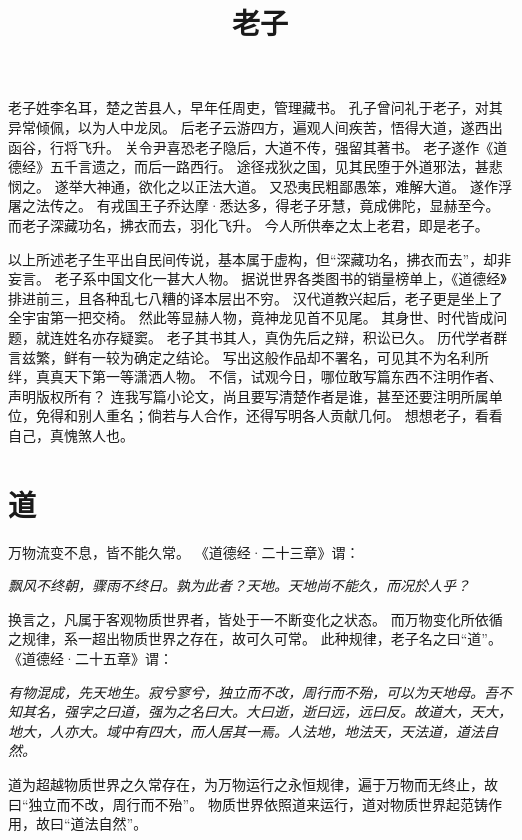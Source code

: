 \documentclass[11pt]{article}
\title{老子}
\date{}
\begin{document}
  \maketitle
  
  \linenumbers

老子姓李名耳，楚之苦县人，早年任周吏，管理藏书。
孔子曾问礼于老子，对其异常倾佩，以为人中龙凤。
后老子云游四方，遍观人间疾苦，悟得大道，遂西出函谷，行将飞升。
关令尹喜恐老子隐后，大道不传，强留其著书。
老子遂作《道德经》五千言遗之，而后一路西行。
途径戎狄之国，见其民堕于外道邪法，甚悲悯之。
遂举大神通，欲化之以正法大道。
又恐夷民粗鄙愚笨，难解大道。
遂作浮屠之法传之。
有戎国王子乔达摩·悉达多，得老子牙慧，竟成佛陀，显赫至今。
而老子深藏功名，拂衣而去，羽化飞升。
今人所供奉之太上老君，即是老子。

\par

以上所述老子生平出自民间传说，基本属于虚构，但“深藏功名，拂衣而去”，却非妄言。
老子系中国文化一甚大人物。
据说世界各类图书的销量榜单上，《道德经》排进前三，且各种乱七八糟的译本层出不穷。
汉代道教兴起后，老子更是坐上了全宇宙第一把交椅。
然此等显赫人物，竟神龙见首不见尾。
其身世、时代皆成问题，就连姓名亦存疑窦。
老子其书其人，真伪先后之辩，积讼已久。
历代学者群言兹繁，鲜有一较为确定之结论。
写出这般作品却不署名，可见其不为名利所绊，真真天下第一等潇洒人物。
不信，试观今日，哪位敢写篇东西不注明作者、声明版权所有？
连我写篇小论文，尚且要写清楚作者是谁，甚至还要注明所属单位，免得和别人重名；倘若与人合作，还得写明各人贡献几何。
想想老子，看看自己，真愧煞人也。

\section{道}
万物流变不息，皆不能久常。
《道德经·二十三章》谓：

\textit{飘风不终朝，骤雨不终日。孰为此者？天地。天地尚不能久，而况於人乎？}

换言之，凡属于客观物质世界者，皆处于一不断变化之状态。
而万物变化所依循之规律，系一超出物质世界之存在，故可久可常。
此种规律，老子名之曰“道”。
《道德经·二十五章》谓：

\textit{有物混成，先天地生。寂兮寥兮，独立而不改，周行而不殆，可以为天地母。吾不知其名，强字之曰道，强为之名曰大。大曰逝，逝曰远，远曰反。故道大，天大，地大，人亦大。域中有四大，而人居其一焉。人法地，地法天，天法道，道法自然。}

道为超越物质世界之久常存在，为万物运行之永恒规律，遍于万物而无终止，故曰“独立而不改，周行而不殆”。
物质世界依照道来运行，道对物质世界起范铸作用，故曰“道法自然”。
\end{document}
